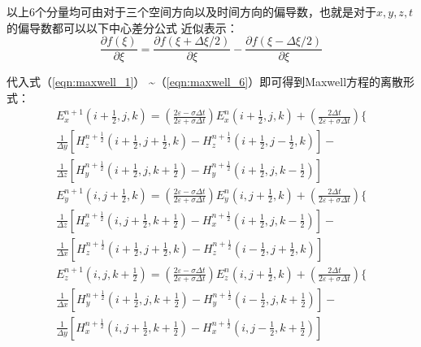  以上6个分量均可由对于三个空间方向以及时间方向的偏导数，也就是对于$x, y, z, t$的偏导数都可以以下中心差分公式
 近似表示：
 \begin{equation} 
 \frac{\partial f(\xi)}{\partial \xi}=\frac{\partial f(\xi+\Delta \xi / 2)}{\partial \xi}-\frac{\partial f(\xi-\Delta \xi / 2)}{\partial \xi}
  \end{equation}

代入式（\ref{eqn:maxwell_1}） \textasciitilde （\ref{eqn:maxwell_6}）即可得到Maxwell方程的离散形式：
\begin{equation} 
\begin{array}{l}{E_{x}^{n+1}\left(i+\frac{1}{2}, j, k\right)=\left(\frac{2 \varepsilon-\sigma \Delta t}{2 \varepsilon+\sigma \Delta t}\right) E_{x}^{n}\left(i+\frac{1}{2}, j, k\right)+\left(\frac{2 \Delta t}{2 \varepsilon+\sigma \Delta t}\right)\{ } \\ {\frac{1}{\Delta y}\left[H_{z}^{n+\frac{1}{2}}\left(i+\frac{1}{2}, j+\frac{1}{2}, k\right)-H_{z}^{n+\frac{1}{2}}\left(i+\frac{1}{2}, j-\frac{1}{2}, k\right)\right]-} \\ {\frac{1}{\Delta z}\left[H_{y}^{n+\frac{1}{2}}\left(i+\frac{1}{2}, j, k+\frac{1}{2}\right)-H_{y}^{n+\frac{1}{2}}\left(i+\frac{1}{2}, j, k-\frac{1}{2}\right)\right]}\end{array}
 \end{equation}
 \begin{equation} 
\begin{array}{l}{E_{y}^{n+1}\left(i, j+\frac{1}{2}, k\right)=\left(\frac{2 \varepsilon-\sigma \Delta t}{2 \varepsilon+\sigma \Delta t}\right) E_{y}^{n}\left(i, j+\frac{1}{2}, k\right)+\left(\frac{2 \Delta t}{2 \varepsilon+\sigma \Delta t}\right)\{ } \\ {\frac{1}{\Delta z}\left[H_{x}^{n+\frac{1}{2}}\left(i, j+\frac{1}{2}, k+\frac{1}{2}\right)-H_{x}^{n+\frac{1}{2}}\left(i+\frac{1}{2}, j, k-\frac{1}{2}\right)\right]-} \\ {\frac{1}{\Delta x}\left[H_{z}^{n+\frac{1}{2}}\left(i+\frac{1}{2}, j+\frac{1}{2}, k\right)-H_{z}^{n+\frac{1}{2}}\left(i-\frac{1}{2}, j+\frac{1}{2}, k\right)\right]}\end{array}
 \end{equation}
 \begin{equation} 
\begin{array}{l}{E_{z}^{n+1}\left(i, j, k+\frac{1}{2}\right)=\left(\frac{2 \varepsilon-\sigma \Delta t}{2 \varepsilon+\sigma \Delta t}\right) E_{z}^{n}\left(i, j+\frac{1}{2}, k\right)+\left(\frac{2 \Delta t}{2 \varepsilon+\sigma \Delta t}\right)\{ } \\ {\frac{1}{\Delta x}\left[H_{y}^{n+\frac{1}{2}}\left(i+\frac{1}{2}, j, k+\frac{1}{2}\right)-H_{y}^{n+\frac{1}{2}}\left(i-\frac{1}{2}, j, k+\frac{1}{2}\right)\right]-} \\ {\frac{1}{\Delta y}\left[H_{x}^{n+\frac{1}{2}}\left(i, j+\frac{1}{2}, k+\frac{1}{2}\right)-H_{x}^{n+\frac{1}{2}}\left(i, j-\frac{1}{2}, k+\frac{1}{2}\right)\right]}\end{array}
 \end{equation}
